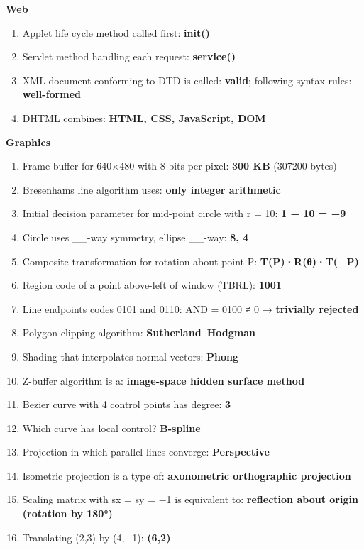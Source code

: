 \textbf{Web}

\begin{enumerate}
\def\labelenumi{\arabic{enumi}.}
\setcounter{enumi}{22}
\tightlist
\item
  Applet life cycle method called first: \textbf{init()}
\item
  Servlet method handling each request: \textbf{service()}
\item
  XML document conforming to DTD is called: \textbf{valid}; following syntax rules: \textbf{well-formed}
\item
  DHTML combines: \textbf{HTML, CSS, JavaScript, DOM}
\end{enumerate}

\textbf{Graphics}

\begin{enumerate}
\def\labelenumi{\arabic{enumi}.}
\setcounter{enumi}{26}
\tightlist
\item
  Frame buffer for 640×480 with 8 bits per pixel: \textbf{300 KB} (307200 bytes)
\item
  Bresenham\textquotesingle s line algorithm uses: \textbf{only integer arithmetic}
\item
  Initial decision parameter for mid-point circle with r = 10: \textbf{1 − 10 = −9}
\item
  Circle uses \_\_-way symmetry, ellipse \_\_-way: \textbf{8, 4}
\item
  Composite transformation for rotation about point P: \textbf{T(P)·R(θ)·T(−P)}
\item
  Region code of a point above-left of window (TBRL): \textbf{1001}
\item
  Line endpoints codes 0101 and 0110: AND = 0100 ≠ 0 → \textbf{trivially rejected}
\item
  Polygon clipping algorithm: \textbf{Sutherland--Hodgman}
\item
  Shading that interpolates normal vectors: \textbf{Phong}
\item
  Z-buffer algorithm is a: \textbf{image-space hidden surface method}
\item
  Bezier curve with 4 control points has degree: \textbf{3}
\item
  Which curve has local control? \textbf{B-spline}
\item
  Projection in which parallel lines converge: \textbf{Perspective}
\item
  Isometric projection is a type of: \textbf{axonometric orthographic projection}
\item
  Scaling matrix with sx = sy = −1 is equivalent to: \textbf{reflection about origin (rotation by 180°)}
\item
  Translating (2,3) by (4,−1): \textbf{(6,2)}
\end{enumerate}

